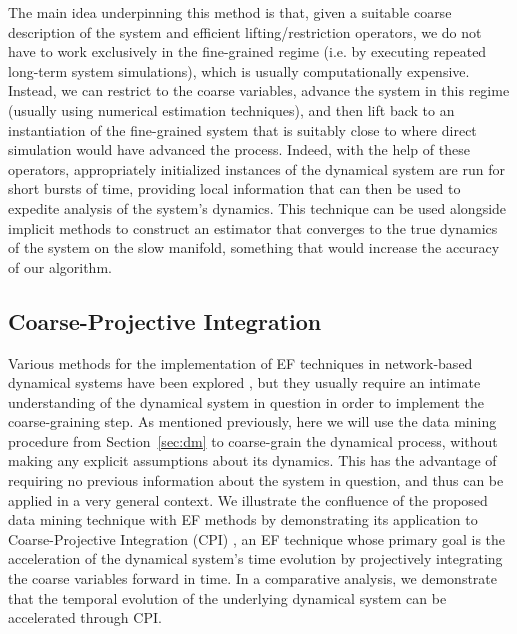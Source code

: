 The main idea underpinning this method is that, given a suitable
coarse description of the system and efficient lifting/restriction
operators, we do not have to work exclusively in the fine-grained
regime (i.e. by executing repeated long-term system simulations),
which is usually computationally expensive. Instead, we can restrict
to the coarse variables, advance the system in this regime (usually
using numerical estimation techniques), and then lift back to an
instantiation of the fine-grained system that is suitably close to
where direct simulation would have advanced the process. Indeed, with
the help of these operators, appropriately initialized instances of
the dynamical system are run for short bursts of time, providing local
information that can then be used to expedite analysis of the system's
dynamics. This technique can be used alongside implicit methods
\cite{marschler2014implicit} to construct an estimator that converges
to the true dynamics of the system on the slow manifold, something
that would increase the accuracy of our algorithm.


\subsection{Coarse-Projective Integration}

Various methods for the implementation of EF techniques in
network-based dynamical systems have been explored
\cite{bold2014equation} \cite{holiday2016equation}, but they usually
require an intimate understanding of the dynamical system in question
in order to implement the coarse-graining step. As mentioned
previously, here we will use the data mining procedure from
Section~\ref{sec:dm} to coarse-grain the dynamical process, without
making any explicit assumptions about its dynamics. This has the
advantage of requiring no previous information about the system in
question, and thus can be applied in a very general context. We
illustrate the confluence of the proposed data mining technique with
EF methods by demonstrating its application to Coarse-Projective
Integration (CPI) \cite{gear2003projective}, an EF technique whose
primary goal is the acceleration of the dynamical system's time
evolution by projectively integrating the coarse variables forward in
time. In a comparative analysis, we demonstrate that the temporal
evolution of the underlying dynamical system can be accelerated
through CPI.

